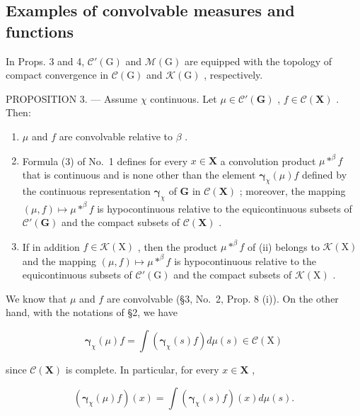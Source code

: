 \subsection{Examples of convolvable measures and functions}

In Props. 3 and 4, \(\mathcal{C}'(\mathrm{G})\) and \(\mathcal{M}(\mathrm{G})\) are equipped with the topology of compact convergence in \(\mathcal{C}(\mathrm{G})\) and \(\mathcal{K}(\mathrm{G})\) , respectively.

PROPOSITION 3. --- Assume \(\chi\) continuous. Let \(\mu \in \mathcal{C}'(\mathbf{G})\) , \(f \in \mathcal{C}(\mathbf{X})\) . Then:

\begin{enumerate}
\def\labelenumi{(\roman{enumi})}
\item
  \(\mu\) and \(f\) are convolvable relative to \(\beta\) .
\item
  Formula (3) of No.~1 defines for every \(x \in \mathbf{X}\) a convolution product \(\mu *^{\beta}f\) that is continuous and is none other than the element \(\pmb{\gamma}_{\chi}(\mu)f\) defined by the continuous representation \(\pmb{\gamma}_{\chi}\) of \(\mathbf{G}\) in \(\mathcal{C}(\mathbf{X})\) ; moreover, the mapping \((\mu, f) \mapsto \mu *^{\beta}f\) is hypocontinuous relative to the equicontinuous subsets of \(\mathcal{C}'(\mathbf{G})\) and the compact subsets of \(\mathcal{C}(\mathbf{X})\) .
\item
  If in addition \(f \in \mathcal{K}(\mathrm{X})\) , then the product \(\mu *^{\beta}f\) of (ii) belongs to \(\mathcal{K}(\mathrm{X})\) and the mapping \((\mu, f) \mapsto \mu *^{\beta}f\) is hypocontinuous relative to the equicontinuous subsets of \(\mathcal{C}'(\mathrm{G})\) and the compact subsets of \(\mathcal{K}(\mathrm{X})\) .
\end{enumerate}

We know that \(\mu\) and \(f\) are convolvable (§3, No.~2, Prop. 8 (i)). On the other hand, with the notations of §2, we have

\[
\boldsymbol {\gamma} _ {\chi} (\mu) f = \int \left(\boldsymbol {\gamma} _ {\chi} (s) f\right) d \mu (s) \in \mathcal {C} (\mathrm{X})
\]

since \(\mathcal{C}(\mathbf{X})\) is complete. In particular, for every \(x\in \mathbf{X}\) ,

\[
\left(\boldsymbol {\gamma} _ {\chi} (\mu) f\right) (x) = \int \left(\boldsymbol {\gamma} _ {\chi} (s) f\right) (x) d \mu (s).
\]

